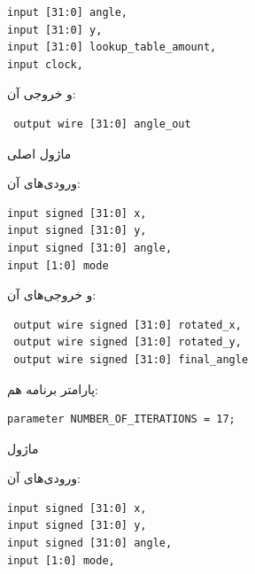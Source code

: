 \documentclass[12pt,titlepage,a4page , tikz , multi,table , svgnames,xcdraw]{article}
\begin{document}
\begin{latin}
\begin{verbatim}
input [31:0] angle,
input [31:0] y,
input [31:0] lookup_table_amount,
input clock,
\end{verbatim}
\end{latin}

و خروجی آن:

\begin{latin}
\begin{verbatim}
 output wire [31:0] angle_out
\end{verbatim}
\end{latin}

\hrulefill


 ماژول اصلی   

ورودی‌های آن:

\begin{latin}
\begin{verbatim}
input signed [31:0] x,
input signed [31:0] y,
input signed [31:0] angle,
input [1:0] mode
\end{verbatim}
\end{latin}

و خروجی‌های آن:

\begin{latin}
\begin{verbatim}
 output wire signed [31:0] rotated_x,
 output wire signed [31:0] rotated_y,
 output wire signed [31:0] final_angle
\end{verbatim}
\end{latin}


پارامتر برنامه هم:

\begin{latin}
\begin{verbatim}
parameter NUMBER_OF_ITERATIONS = 17;
\end{verbatim}
\end{latin}


\hrulefill

ماژول 

ورودی‌های آن:

\begin{latin}

\begin{verbatim}
input signed [31:0] x,
input signed [31:0] y,
input signed [31:0] angle,
input [1:0] mode,
   
\end{verbatim}

\end{latin}
\end{document}
